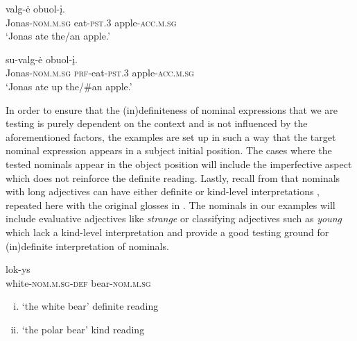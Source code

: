 \documentclass[output=paper,
modfonts
]{langscibook}
\begin{document}
\begin{exe}
\ex \label{ex:sereikaite:30}
\begin{xlist}
	\ex \label{ex:sereikaite:30a}
	 {valg-ė} {obuol-į}.\\
	Jonas-\textsc{nom.m.sg} eat-\textsc{pst.3} apple-\textsc{acc.m.sg}\\
	\trans `Jonas ate the/an apple.' \citep[75]{GillonArmoskaite2015}
	
	\ex \label{ex:sereikaite:30b}
	 {su-valg-ė} {obuol-į}.\\
	Jonas-\textsc{nom.m.sg} \textsc{prf}-eat-\textsc{pst.3} apple-\textsc{acc.m.sg}\\
	\trans `Jonas ate up the/\#an apple.' \citep[76]{GillonArmoskaite2015}
\end{xlist}
\end{exe}

In order to ensure that the (in)definiteness of nominal expressions that we are testing is purely dependent on the context and is not influenced by the aforementioned factors, the examples are set up in such a way that the target nominal expression appears in a subject initial position. The cases where the tested nominals appear in the object position will include the imperfective aspect which does not reinforce the definite reading.
Lastly, recall from  that nominals with long adjectives can have either definite or kind-level interpretations , repeated here with the original glosses in . The nominals in our examples will include evaluative adjectives like \textit{strange} or classifying adjectives such as \textit{young} which lack a kind-level interpretation and provide a good testing ground for (in)definite interpretation of nominals.\largerpage[-2]


\begin{exe} 
\ex \label{ex:sereikaite:31}
 {lok-ys} \\
white-\textsc{nom.m.sg}-{\textsc{def}} bear-\textsc{nom.m.sg}  \\
\trans 
\begin{enumerate}[(i)]
	\item `the white bear' \checkmark definite reading  
	\item `the polar bear' \checkmark kind reading  
\end{enumerate}
\end{exe}
\end{document}
